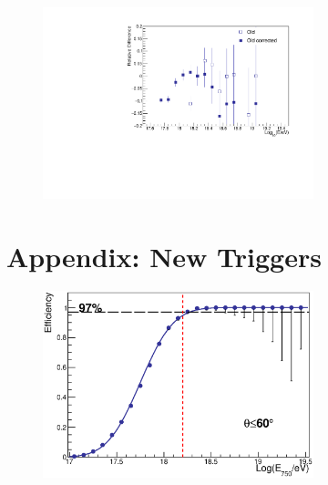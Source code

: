 \documentclass[12pt,a4paper]{article}
\begin{document}
\begin{figure}[h]
\begin{center}
\includegraphics[width=0.7\textwidth]{plots/differenceOT.pdf}
\caption{
\label{fig:difference}}
\end{center}
\end{figure} 


\section*{Appendix: New Triggers}

\begin{figure}[h]
\begin{center}
 \includegraphics[width=0.7\textwidth]{plots/allZenithNew.eps}  
\caption{   
\label{fig:allZenithNew}}
\end{center}
\end{figure}
\end{document}
